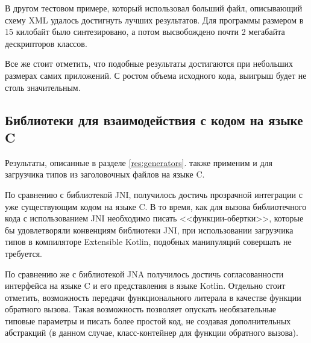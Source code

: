 В другом тестовом примере, который использовал больший файл, описывающий схему XML удалось достигнуть лучших результатов. Для программы размером в 15 килобайт было синтезировано, а потом высвобождено почти 2 мегабайта дескрипторов классов.

Все же стоит отметить, что подобные результаты достигаются при небольших размерах самих приложений.
С ростом объема исходного кода, выигрыш будет не столь значительным.

\subsection{Библиотеки для взаимодействия с кодом на языке C}
Результаты, описанные в разделе \ref{res:generators}. также применим и для загрузчика типов из заголовочных файлов на языке C.

По сравнению с библиотекой JNI, получилось достичь прозрачной интеграции с уже существующим кодом на языке C.
В то время, как для вызова библиотечного кода с использованием JNI необходимо писать <<функции-обертки>>, которые бы удовлетворяли конвенциям библиотеки JNI, при использовании загрузчика типов в компиляторе Extensible Kotlin, подобных манипуляций совершать не требуется.

По сравнению же с библиотекой JNA получилось достичь согласованности интерфейса на языке C и его представления в языке Kotlin. Отдельно стоит отметить, возможность передачи функционального литерала в качестве функции обратного вызова.
Такая возможность позволяет опускать необязательные типовые параметры и писать более простой код, не создавая дополнительных абстракций (в данном случае, класс-контейнер для функции обратного вызова).
